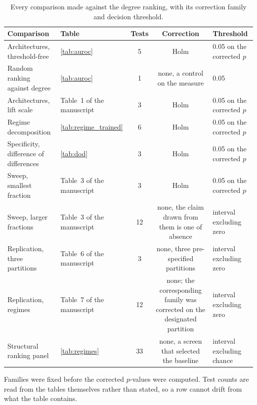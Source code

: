 \begin{table}[htbp]
\centering
\caption{Every comparison made against the degree ranking, with its correction family and decision threshold.}
\label{tab:si_rules}
\small
\setlength{\tabcolsep}{4pt}
\begin{tabular}{llccl}
\toprule
Comparison & Table & Tests & Correction & Threshold \\
\midrule
Architectures, threshold-free & \ref{tab:auroc} & 5 & Holm & 0.05 on the corrected $p$ \\
Random ranking against degree & \ref{tab:auroc} & 1 & none, a control on the measure & 0.05 \\
Architectures, lift scale & Table~1 of the manuscript & 3 & Holm & 0.05 on the corrected $p$ \\
Regime decomposition & \ref{tab:regime_trained} & 6 & Holm & 0.05 on the corrected $p$ \\
Specificity, difference of differences & \ref{tab:dod} & 3 & Holm & 0.05 on the corrected $p$ \\
Sweep, smallest fraction & Table~3 of the manuscript & 3 & Holm & 0.05 on the corrected $p$ \\
Sweep, larger fractions & Table~3 of the manuscript & 12 & none, the claim drawn from them is one of absence & interval excluding zero \\
Replication, three partitions & Table~6 of the manuscript & 3 & none, three pre-specified partitions & interval excluding zero \\
Replication, regimes & Table~7 of the manuscript & 12 & none; the corresponding family was corrected on the designated partition & interval excluding zero \\
Structural ranking panel & \ref{tab:regimes} & 33 & none, a screen that selected the baseline & interval excluding chance \\
\bottomrule
\end{tabular}
\begin{flushleft}\footnotesize Families were fixed before the corrected $p$-values were computed. Test counts are read from the tables themselves rather than stated, so a row cannot drift from what the table contains.\end{flushleft}
\end{table}
